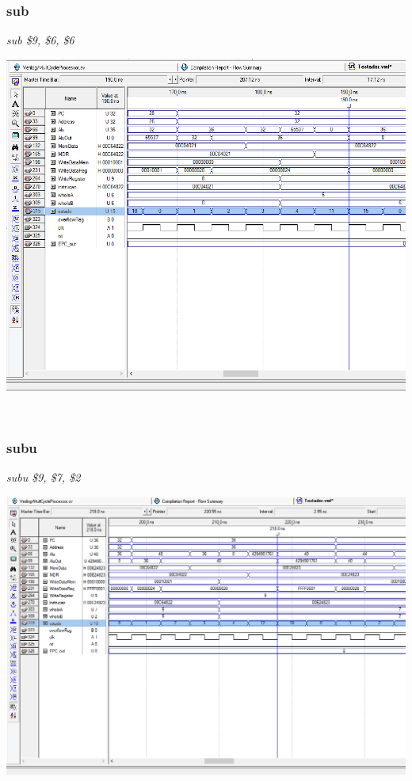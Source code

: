 \documentclass{article}
\begin{document}
    \\
    \subsubsection{sub}
    {\it sub \$9, \$6, \$6}\\
    \begin{center}
        \includegraphics[scale=0.25]{sub.PNG}
    \end{center}
    
    \\
    \subsubsection{subu}
    {\it subu \$9, \$7, \$2}\\
    \begin{center}
        \includegraphics[scale=0.25]{subu.PNG}
    \end{center}
    
\end{document}
